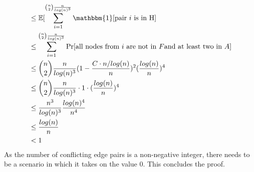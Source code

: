 \documentclass[a4paper,german]{article}
\begin{document}
\begin{enumerate}
\begin{align*}
&\leq \mathbb{E}[\sum_{i=1}^{{{n} \choose {2}} \frac{n}{log(n)^3}} \mathbbm{1}[\text{pair } i \text{ is in H}]\\
&\leq \sum_{i=1}^{{{n} \choose {2}} \frac{n}{log(n)^3}} \Pr[\text{all nodes from } i \text{ are not in } F \text{and at least two in } A]\\
&\leq {{n} \choose {2}} \frac{n}{log(n)^3} (1 - \frac{C\cdot n/log(n)}{n})^2 (\frac{log(n)}{n})^4 \\
&\leq {{n} \choose {2}} \frac{n}{log(n)^3} \cdot 1 \cdot  (\frac{log(n)}{n})^4 \\
&\leq \frac{n^3}{log(n)^3} \frac{log(n)^4}{n^4} \\
&\leq \frac{log(n)}{n} \\
&< 1
\end{align*}
As the number of conflicting edge pairs is a non-negative integer, there needs to be a scenario in which it takes on the value 0. This concludes the proof.
\end{enumerate}
\end{document}
